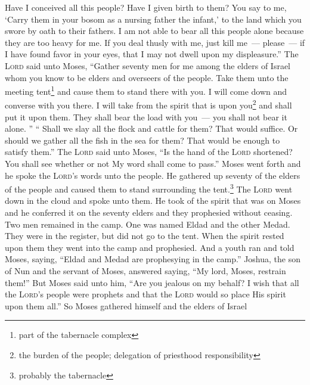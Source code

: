 \begin{enumerate}[align=center]
     Have I conceived all this people? Have I given birth to them? You say to me, `Carry them in your bosom as a nursing father the infant,' to the land which you swore by oath to their fathers.%
     I am not able to bear all this people alone because they are too heavy for me.%
     If you deal thusly with me, just kill me~--- please~--- if I have found favor in your eyes, that I may not dwell upon my displeasure.''%
     The \textsc{Lord} said unto Moses, ``Gather seventy men for me among the elders of Israel whom you know to be elders and overseers of the people. Take them unto the meeting tent\footnote{part of the tabernacle complex} and cause them to stand there with you.%
     I will come down and converse with you there. I will take from the spirit that is upon you\footnote{the burden of the people; delegation of priesthood responsibility} and shall put it upon them. They shall bear the load with you~--- you shall not bear it alone.%
     ''%
     ``%
     Shall we slay all the flock and cattle for them? That would suffice. Or should we gather all the fish in the sea for them? That would be enough to satisfy them.''%
     The \textsc{Lord} said unto Moses, ``Is the hand of the \textsc{Lord} shortened? You shall see whether or not My word shall come to pass.''%
     Moses went forth and he spoke the \textsc{Lord}'s words unto the people. He gathered up seventy of the elders of the people and caused them to stand surrounding the tent.\footnote{probably the tabernacle}%
     The \textsc{Lord} went down in the cloud and spoke unto them. He took of the spirit that was on Moses and he conferred it on the seventy elders and they prophesied without ceasing.%
     Two men remained in the camp. One was named Eldad and the other Medad. They were in the register, but did not go to the tent. When the spirit rested upon them they went into the camp and prophesied.%
     And a youth ran and told Moses, saying, ``Eldad and Medad are prophesying in the camp.''%
     Joshua, the son of Nun and the servant of Moses, answered saying, ``My lord, Moses, restrain them!''%
     But Moses said unto him, ``Are you jealous on my behalf? I wish that all the \textsc{Lord}'s people were prophets and that the \textsc{Lord} would so place His spirit upon them all.''%
     So Moses gathered himself and the elders of Israel%

\end{enumerate}
